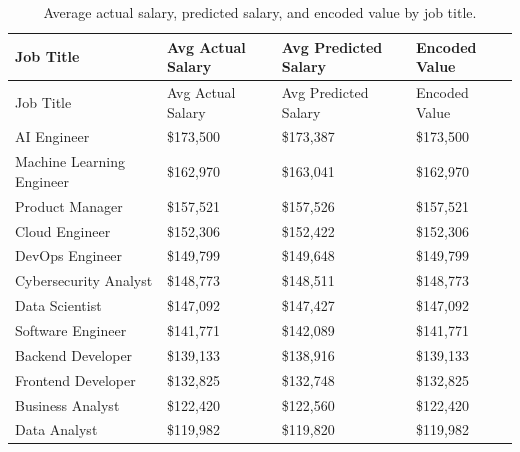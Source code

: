 \documentclass[
]{article}
\begin{document}
\begin{longtable}[]{@{}
  >{\raggedright\arraybackslash}p{}
  >{\raggedright\arraybackslash}p{}
  >{\raggedright\arraybackslash}p{}
  >{\raggedright\arraybackslash}p{}@{}}
\caption{Average actual salary, predicted salary, and encoded value by
job title.}\tabularnewline
\toprule\noalign{}
\begin{minipage}[b]{\linewidth}\raggedright
Job Title
\end{minipage} & \begin{minipage}[b]{\linewidth}\raggedright
Avg Actual Salary
\end{minipage} & \begin{minipage}[b]{\linewidth}\raggedright
Avg Predicted Salary
\end{minipage} & \begin{minipage}[b]{\linewidth}\raggedright
Encoded Value
\end{minipage} \\
\midrule\noalign{}
\endfirsthead
\toprule\noalign{}
\begin{minipage}[b]{\linewidth}\raggedright
Job Title
\end{minipage} & \begin{minipage}[b]{\linewidth}\raggedright
Avg Actual Salary
\end{minipage} & \begin{minipage}[b]{\linewidth}\raggedright
Avg Predicted Salary
\end{minipage} & \begin{minipage}[b]{\linewidth}\raggedright
Encoded Value
\end{minipage} \\
\midrule\noalign{}
\endhead
\bottomrule\noalign{}
\endlastfoot
AI Engineer & \$173,500 & \$173,387 & \$173,500 \\
Machine Learning Engineer & \$162,970 & \$163,041 & \$162,970 \\
Product Manager & \$157,521 & \$157,526 & \$157,521 \\
Cloud Engineer & \$152,306 & \$152,422 & \$152,306 \\
DevOps Engineer & \$149,799 & \$149,648 & \$149,799 \\
Cybersecurity Analyst & \$148,773 & \$148,511 & \$148,773 \\
Data Scientist & \$147,092 & \$147,427 & \$147,092 \\
Software Engineer & \$141,771 & \$142,089 & \$141,771 \\
Backend Developer & \$139,133 & \$138,916 & \$139,133 \\
Frontend Developer & \$132,825 & \$132,748 & \$132,825 \\
Business Analyst & \$122,420 & \$122,560 & \$122,420 \\
Data Analyst & \$119,982 & \$119,820 & \$119,982 \\
\end{longtable}
\end{document}

